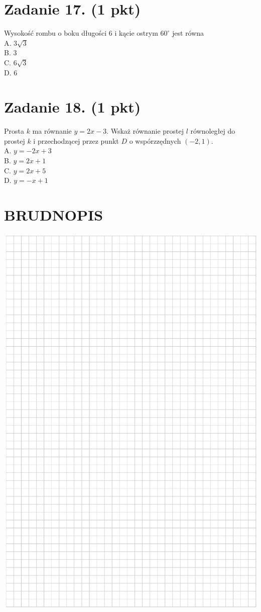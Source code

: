 \documentclass[10pt]{article}
\begin{document}
\section*{Zadanie 17. (1 pkt)}
Wysokość rombu o boku długości 6 i kącie ostrym \(60^{\circ}\) jest równa\\
A. \(3 \sqrt{3}\)\\
B. 3\\
C. \(6 \sqrt{3}\)\\
D. 6

\section*{Zadanie 18. (1 pkt)}
Prosta \(k\) ma równanie \(y=2 x-3\). Wskaż równanie prostej \(l\) równoległej do prostej \(k\) i przechodzącej przez punkt \(D\) o wspórzzędnych \((-2,1)\).\\
A. \(y=-2 x+3\)\\
B. \(y=2 x+1\)\\
C. \(y=2 x+5\)\\
D. \(y=-x+1\)

\section*{BRUDNOPIS}
\begin{center}
\includegraphics[max width=\textwidth]{2024_11_21_5b6b7ffa9006e3f448adg-07}
\end{center}
\end{document}
